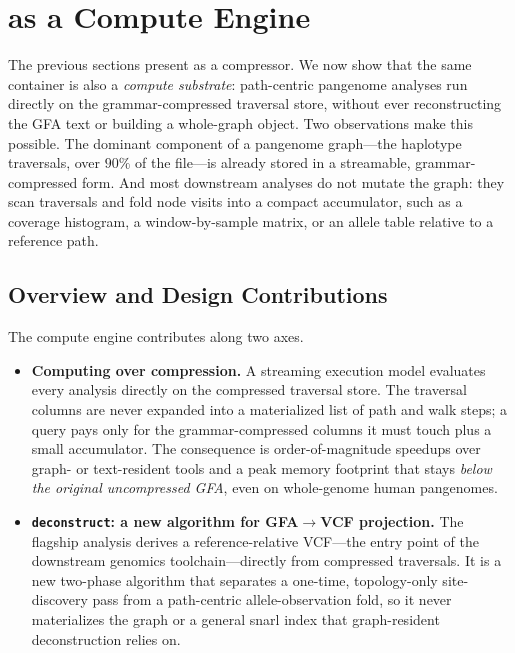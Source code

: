 \section{\gfaz as a Compute Engine}\label{sec:compute}

The previous sections present \gfaz as a compressor. We now show that the same
container is also a \emph{compute substrate}: path-centric pangenome analyses run
directly on the grammar-compressed traversal store, without ever reconstructing the
GFA text or building a whole-graph object. Two observations make this possible. The
dominant component of a pangenome graph---the haplotype traversals, over $90\%$ of
the file---is already stored in a streamable, grammar-compressed form. And most
downstream analyses do not mutate the graph: they scan traversals and fold node
visits into a compact accumulator, such as a coverage histogram, a window-by-sample
matrix, or an allele table relative to a reference path.

\subsection{Overview and Design Contributions}\label{subsec:ce-overview}

The compute engine contributes along two axes.

\begin{itemize}[noitemsep, topsep=2pt, leftmargin=*]
  \item \textbf{Computing over compression.} A streaming execution model evaluates
        every analysis directly on the compressed traversal store. The traversal
        columns are never expanded into a materialized list of path and walk steps;
        a query pays only for the grammar-compressed columns it must touch plus a
        small accumulator. The consequence is order-of-magnitude speedups over
        graph- or text-resident tools and a peak memory footprint that stays
        \emph{below the original uncompressed GFA}, even on whole-genome human
        pangenomes.
  \item \textbf{\texttt{deconstruct}: a new algorithm for GFA$\rightarrow$VCF
        projection.} The flagship analysis derives a reference-relative VCF---the
        entry point of the downstream genomics toolchain---directly from compressed
        traversals. It is a new two-phase algorithm that separates a one-time,
        topology-only site-discovery pass from a path-centric allele-observation
        fold, so it never materializes the graph or a general snarl index that
        graph-resident deconstruction relies on.
\end{itemize}

